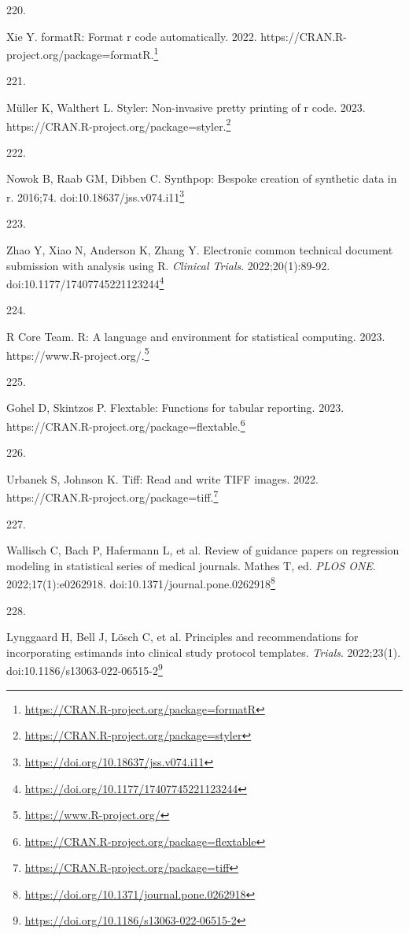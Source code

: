 \documentclass[
  a4paper,
]{book}
\newlength{\cslhangindent}
\newlength{\csllabelwidth}
\newlength{\cslentryspacingunit} %
\newenvironment{CSLReferences}[2] %
 {%
  \setlength{\parindent}{0pt}
  \ifodd #1
  \let\oldpar\par
  \def\par{\hangindent=\cslhangindent\oldpar}
  \fi
  \setlength{\parskip}{#2\cslentryspacingunit}
 }%
 {}
\newcommand{\CSLLeftMargin}[1]{\parbox[t]{\csllabelwidth}{#1}}
\newcommand{\CSLRightInline}[1]{\parbox[t]{\linewidth - \csllabelwidth}{#1}\break}
\renewcommand{\href}[2]{#2\footnote{\url{#1}}}
\begin{document}
\begin{CSLReferences}{0}{0}
\leavevmode{}%
\CSLLeftMargin{220. }%
\CSLRightInline{Xie Y. formatR: Format r code automatically. 2022. \href{https://CRAN.R-project.org/package=formatR}{https://CRAN.R-project.org/package=formatR.}}

\leavevmode{}%
\CSLLeftMargin{221. }%
\CSLRightInline{Müller K, Walthert L. Styler: Non-invasive pretty printing of r code. 2023. \href{https://CRAN.R-project.org/package=styler}{https://CRAN.R-project.org/package=styler.}}

\leavevmode{}%
\CSLLeftMargin{222. }%
\CSLRightInline{Nowok B, Raab GM, Dibben C. {\textbraceleft}Synthpop{\textbraceright}: Bespoke creation of synthetic data in {\textbraceleft}r{\textbraceright}. 2016;74. doi:\href{https://doi.org/10.18637/jss.v074.i11}{10.18637/jss.v074.i11}}

\leavevmode{}%
\CSLLeftMargin{223. }%
\CSLRightInline{Zhao Y, Xiao N, Anderson K, Zhang Y. Electronic common technical document submission with analysis using R. \emph{Clinical Trials}. 2022;20(1):89-92. doi:\href{https://doi.org/10.1177/17407745221123244}{10.1177/17407745221123244}}

\leavevmode{}%
\CSLLeftMargin{224. }%
\CSLRightInline{R Core Team. R: A language and environment for statistical computing. 2023. \href{https://www.R-project.org/}{https://www.R-project.org/.}}

\leavevmode{}%
\CSLLeftMargin{225. }%
\CSLRightInline{Gohel D, Skintzos P. Flextable: Functions for tabular reporting. 2023. \href{https://CRAN.R-project.org/package=flextable}{https://CRAN.R-project.org/package=flextable.}}

\leavevmode{}%
\CSLLeftMargin{226. }%
\CSLRightInline{Urbanek S, Johnson K. Tiff: Read and write TIFF images. 2022. \href{https://CRAN.R-project.org/package=tiff}{https://CRAN.R-project.org/package=tiff.}}

\leavevmode{}%
\CSLLeftMargin{227. }%
\CSLRightInline{Wallisch C, Bach P, Hafermann L, et al. Review of guidance papers on regression modeling in statistical series of medical journals. Mathes T, ed. \emph{PLOS ONE}. 2022;17(1):e0262918. doi:\href{https://doi.org/10.1371/journal.pone.0262918}{10.1371/journal.pone.0262918}}

\leavevmode{}%
\CSLLeftMargin{228. }%
\CSLRightInline{Lynggaard H, Bell J, Lösch C, et al. Principles and recommendations for incorporating estimands into clinical study protocol templates. \emph{Trials}. 2022;23(1). doi:\href{https://doi.org/10.1186/s13063-022-06515-2}{10.1186/s13063-022-06515-2}}


\end{CSLReferences}
\end{document}
